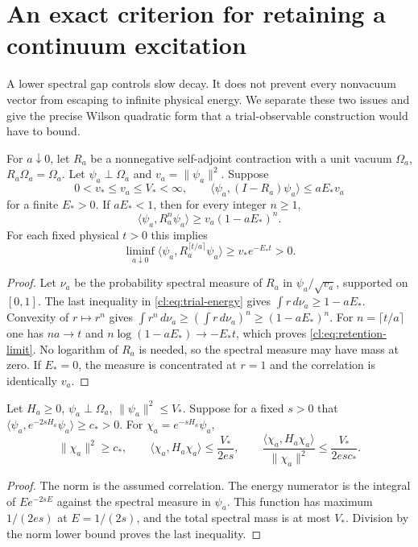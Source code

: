 \section{An exact criterion for retaining a continuum excitation}\label{cl:sec:retention}

A lower spectral gap controls slow decay. It does not prevent every
nonvacuum vector from escaping to infinite physical energy. We separate
these two issues and give the precise Wilson quadratic form that a
trial-observable construction would have to bound.

\begin{proposition}\label{cl:prop:retention}
For $a\downarrow0$, let $R_a$ be a nonnegative self-adjoint contraction
with a unit vacuum $\Omega_a$, $R_a\Omega_a=\Omega_a$. Let
$\psi_a\perp\Omega_a$ and $v_a=\|\psi_a\|^2$. Suppose
\begin{equation}\label{cl:eq:trial-energy}
0<v_*\le v_a\le V_*<\infty,\qquad
\langle\psi_a,(I-R_a)\psi_a\rangle\le aE_*v_a
\end{equation}
for a finite $E_*>0$. If $aE_*<1$, then for every integer $n\ge1$,
\[
\langle\psi_a,R_a^n\psi_a\rangle\ge v_a(1-aE_*)^n.
\]
For each fixed physical $t>0$ this implies
\begin{equation}\label{cl:eq:retention-limit}
\liminf_{a\downarrow0}
\langle\psi_a,R_a^{\lceil t/a\rceil}\psi_a\rangle
\ge v_*e^{-E_*t}>0.
\end{equation}
\end{proposition}
\begin{proof}
Let $\nu_a$ be the probability spectral measure of $R_a$ in
$\psi_a/\sqrt{v_a}$, supported on $[0,1]$. The last inequality in
\eqref{cl:eq:trial-energy} gives $\int r\,d\nu_a\ge1-aE_*$.
Convexity of $r\mapsto r^n$ gives
$\int r^n\,d\nu_a\ge(\int r\,d\nu_a)^n\ge(1-aE_*)^n$.
For $n=\lceil t/a\rceil$ one has $na\to t$ and
$n\log(1-aE_*)\to-E_*t$, which proves
\eqref{cl:eq:retention-limit}. No logarithm of $R_a$ is needed, so
the spectral measure may have mass at zero. If $E_*=0$, the measure
is concentrated at $r=1$ and the correlation is identically $v_a$.
\end{proof}

\begin{proposition}\label{cl:prop:filtering}
Let $H_a\ge0$, $\psi_a\perp\Omega_a$, $\|\psi_a\|^2\le V_*$.
Suppose for a fixed $s>0$ that
$\langle\psi_a,e^{-2sH_a}\psi_a\rangle\ge c_*>0$.
For $\chi_a=e^{-sH_a}\psi_a$,
\[
\|\chi_a\|^2\ge c_*,\qquad
\langle\chi_a,H_a\chi_a\rangle\le\frac{V_*}{2es},\qquad
\frac{\langle\chi_a,H_a\chi_a\rangle}{\|\chi_a\|^2}
\le\frac{V_*}{2es c_*}.
\]
\end{proposition}
\begin{proof}
The norm is the assumed correlation. The energy numerator is the
integral of $E e^{-2sE}$ against the spectral measure in $\psi_a$.
This function has maximum $1/(2es)$ at $E=1/(2s)$, and the total
spectral mass is at most $V_*$. Division by the norm lower bound
proves the last inequality.
\end{proof}

